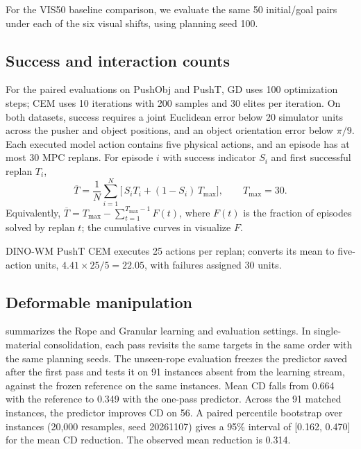 For the VIS50 baseline comparison, we evaluate the same 50 initial/goal pairs under each of the six visual shifts, using planning seed 100.


\subsection{Success and interaction counts}
For the paired evaluations on PushObj and PushT, GD uses 100 optimization steps; CEM uses 10 iterations with 200 samples and 30 elites per iteration. On both datasets, success requires a joint Euclidean error below 20 simulator units across the pusher and object positions, and an object orientation error below $\pi/9$. Each executed model action contains five physical actions, and an episode has at most 30 MPC replans. For episode $i$ with success indicator $S_i$ and first successful replan $T_i$,
\begin{equation}
  \overline{T} = \frac{1}{N}\sum_{i=1}^{N}
  \big[\, S_i T_i + (1-S_i)\, T_{\max} \big], \qquad T_{\max}=30.
\end{equation}
Equivalently, $\overline{T} = T_{\max} - \sum_{t=1}^{T_{\max}-1} F(t)$, where $F(t)$ is the fraction of episodes solved by replan $t$; the cumulative curves in  visualize $F$.

DINO-WM PushT CEM executes 25 actions per replan;  converts its mean to five-action units, $4.41\times25/5=22.05$, with failures assigned 30 units.

\subsection{Deformable manipulation}
 summarizes the Rope and Granular learning and evaluation settings. In single-material consolidation, each pass revisits the same targets in the same order with the same planning seeds. The unseen-rope evaluation freezes the predictor saved after the first pass and tests it on 91 instances absent from the learning stream, against the frozen reference on the same instances. Mean CD falls from 0.664 with the reference to 0.349 with the one-pass predictor. Across the 91 matched instances, the predictor improves CD on 56. A paired percentile bootstrap over instances (20,000 resamples, seed 20261107) gives a 95\% interval of [0.162, 0.470] for the mean CD reduction. The observed mean reduction is 0.314.

